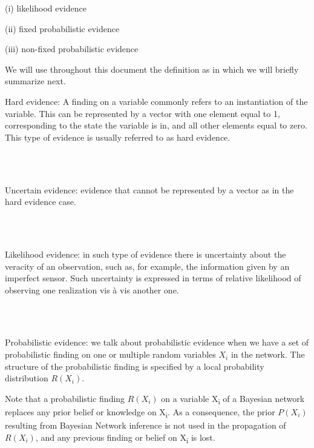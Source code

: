 \documentclass[11pt]{article}
\begin{document}
\begin{article}
(i) likelihood evidence

(ii) fixed probabilistic evidence

(iii) non-fixed probabilistic evidence

We will use throughout this document the definition as in
\cite{Mrad_2015} which we will briefly summarize next.

\begin{definition}
Hard evidence: A finding on a variable commonly refers to an
instantiation of the variable. This can be represented by a vector
with one element equal to 1, corresponding to the state the variable
is in, and all other elements equal to zero. This type of evidence
is usually referred to as hard evidence.
\end{definition}

\\\\

\begin{definition}
Uncertain evidence: evidence that cannot be represented by a vector
as in the hard evidence case.
\end{definition}

\\\\

\begin{definition}
Likelihood evidence: in such type of evidence there is uncertainty
about the veracity of an observation, such as, for example, the
information given by an imperfect sensor. Such uncertainty is
expressed in terms of relative likelihood of observing one
realization vis à vis another one. 
\end{definition}

\\\\

\begin{definition}
Probabilistic evidence: we talk about probabilistic evidence when we
have a set of probabilistic finding on one or multiple random variables $X_i$ in the network.
The structure of the probabilistic finding is specified by a local probability distribution $R(X_i)$.
\end{definition}  

Note that a probabilistic finding \(R(X_i)\) on a variable X\textsubscript{i} of a
Bayesian network replaces any prior belief or knowledge on X\textsubscript{i}. As
a consequence, the prior \(P (X_i)\) resulting from Bayesian Network
inference is not used in the propagation of \(R(X_i)\), and any
previous finding or belief on X\textsubscript{i} is lost.


\end{article}
\end{document}
